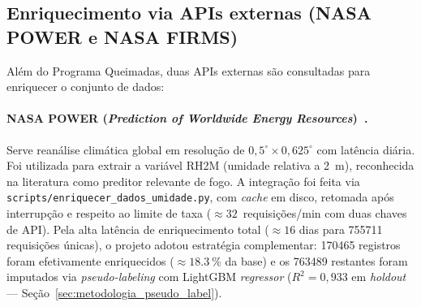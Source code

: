 %


\subsection{Enriquecimento via APIs externas (NASA POWER e NASA FIRMS)}
\label{subsec:metod_apis_externas}

Além do Programa Queimadas, duas APIs externas são consultadas para enriquecer o conjunto de dados:

\paragraph{NASA POWER (\emph{Prediction of Worldwide Energy Resources})~\cite{nasapower}.} Serve reanálise climática global em resolução de \(0{,}5^\circ \times 0{,}625^\circ\) com latência diária. Foi utilizada para extrair a variável RH2M (umidade relativa a 2~m), reconhecida na literatura como preditor relevante de fogo. A integração foi feita via \texttt{scripts/enriquecer\_dados\_umidade.py}, com \emph{cache} em disco, retomada após interrupção e respeito ao limite de taxa (\(\approx 32\)~requisições/min com duas chaves de API). Pela alta latência de enriquecimento total (\(\approx 16\) dias para \num{755711} requisições únicas), o projeto adotou estratégia complementar: \num{170465} registros foram efetivamente enriquecidos (\(\approx \SI{18,3}{\percent}\) da base) e os \num{763489} restantes foram imputados via \emph{pseudo-labeling} com LightGBM \emph{regressor} (\(R^2 = 0{,}933\) em \emph{holdout} --- Seção~\ref{sec:metodologia_pseudo_label}).

